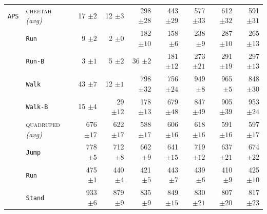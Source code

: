\documentclass{article}
\theoremstyle{plain}
\theoremstyle{definition}
\theoremstyle{remark}
\newcommand{\domainavg}[1]{\textsc{#1} \textit{(avg)}}
\begin{document}
\begin{table}
\begin{tabular}{l l r r r r r r r}
 \rowcolor{gray!15}  \cellcolor{white} \texttt{APS} &  \domainavg{cheetah} & 17 ${\scriptstyle \pm 2}$ & 12 ${\scriptstyle \pm 3}$ & 298 ${\scriptstyle \pm 28}$ & 443 ${\scriptstyle \pm 29}$ & 577 ${\scriptstyle \pm 33}$ & 612 ${\scriptstyle \pm 32}$ & 591 ${\scriptstyle \pm 31}$ \\
& \hspace{.5em}\texttt{Run} & 9 ${\scriptstyle \pm 2}$ & 2 ${\scriptstyle \pm 0}$ & 182 ${\scriptstyle \pm 10}$ & 158 ${\scriptstyle \pm 6}$ & 238 ${\scriptstyle \pm 9}$ & 287 ${\scriptstyle \pm 10}$ & 265 ${\scriptstyle \pm 13}$ \\
& \hspace{.5em}\texttt{Run-B} & 3 ${\scriptstyle \pm 1}$ & 5 ${\scriptstyle \pm 2}$ & 36 ${\scriptstyle \pm 2}$ & 181 ${\scriptstyle \pm 12}$ & 273 ${\scriptstyle \pm 21}$ & 291 ${\scriptstyle \pm 19}$ & 297 ${\scriptstyle \pm 13}$ \\
& \hspace{.5em}\texttt{Walk} & 43 ${\scriptstyle \pm 7}$ & 12 ${\scriptstyle \pm 1}$ & 798 ${\scriptstyle \pm 32}$ & 756 ${\scriptstyle \pm 24}$ & 949 ${\scriptstyle \pm 8}$ & 965 ${\scriptstyle \pm 5}$ & 848 ${\scriptstyle \pm 30}$ \\
& \hspace{.5em}\texttt{Walk-B} & 15 ${\scriptstyle \pm 4}$ & 29 ${\scriptstyle \pm 12}$ & 178 ${\scriptstyle \pm 13}$ & 679 ${\scriptstyle \pm 48}$ & 847 ${\scriptstyle \pm 49}$ & 905 ${\scriptstyle \pm 39}$ & 953 ${\scriptstyle \pm 24}$ \\
\addlinespace
 \rowcolor{gray!15}  \cellcolor{white} & \domainavg{quadruped} & 676 ${\scriptstyle \pm 17}$ & 622 ${\scriptstyle \pm 17}$ & 588 ${\scriptstyle \pm 17}$ & 606 ${\scriptstyle \pm 16}$ & 618 ${\scriptstyle \pm 16}$ & 591 ${\scriptstyle \pm 16}$ & 597 ${\scriptstyle \pm 17}$ \\
& \hspace{.5em}\texttt{Jump} & 778 ${\scriptstyle \pm 5}$ & 712 ${\scriptstyle \pm 8}$ & 662 ${\scriptstyle \pm 9}$ & 641 ${\scriptstyle \pm 15}$ & 719 ${\scriptstyle \pm 12}$ & 637 ${\scriptstyle \pm 21}$ & 674 ${\scriptstyle \pm 22}$ \\
& \hspace{.5em}\texttt{Run} & 475 ${\scriptstyle \pm 1}$ & 440 ${\scriptstyle \pm 4}$ & 421 ${\scriptstyle \pm 5}$ & 443 ${\scriptstyle \pm 7}$ & 439 ${\scriptstyle \pm 6}$ & 410 ${\scriptstyle \pm 9}$ & 425 ${\scriptstyle \pm 10}$ \\
& \hspace{.5em}\texttt{Stand} & 933 ${\scriptstyle \pm 6}$ & 879 ${\scriptstyle \pm 9}$ & 835 ${\scriptstyle \pm 9}$ & 849 ${\scriptstyle \pm 15}$ & 830 ${\scriptstyle \pm 21}$ & 807 ${\scriptstyle \pm 20}$ & 817 ${\scriptstyle \pm 23}$ \\

\end{tabular}
\end{table}
\end{document}
